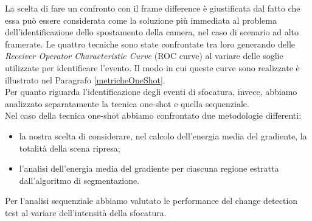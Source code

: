La scelta di fare un confronto con il frame difference \`e giustificata dal fatto che essa pu\`o essere considerata come la soluzione pi\`u immediata al problema dell'identificazione dello spostamento della camera, nel caso di scenario ad alto framerate.
Le quattro tecniche sono state confrontate tra loro generando delle \textit{Receiver Operator Characteristic Curve} (ROC curve) al variare delle soglie utilizzate per identificare l'evento.
Il modo in cui queste curve sono realizzate \`e illustrato nel Paragrafo \ref{metricheOneShot}.\\
Per quanto riguarda l'identificazione degli eventi di sfocatura, invece, abbiamo analizzato separatamente la tecnica one-shot e quella sequenziale.\\
Nel caso della tecnica one-shot abbiamo confrontato due metodologie differenti:
\begin{itemize}
	 \item la nostra scelta di considerare, nel calcolo dell'energia media del gradiente, la totalit\`a della scena ripresa;
	 \item l'analisi dell'energia media del gradiente per ciascuna regione estratta dall'algoritmo di segmentazione.
\end{itemize}
Per l'analisi sequenziale abbiamo valutato le performance del change detection test al variare dell'intensit\`a della sfocatura. 
